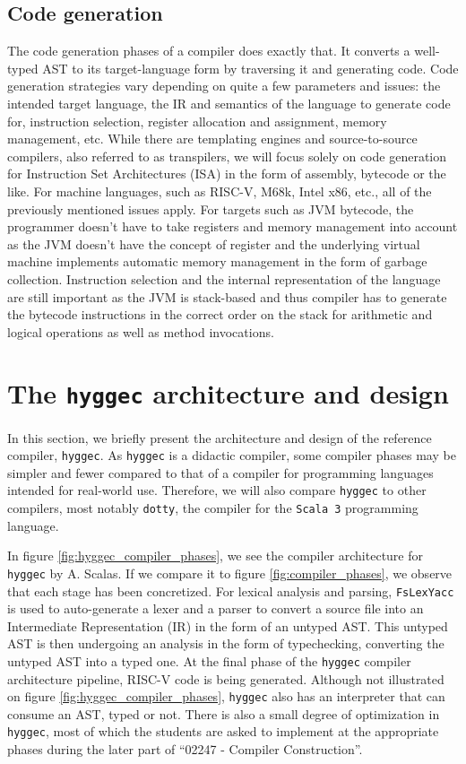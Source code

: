 \subsection{Code generation}

The code generation phases of a compiler does exactly that. It converts a well-typed AST to its target-language form by traversing it and generating code.
Code generation strategies vary depending on quite a few parameters and issues: the intended target language, the IR and semantics of the language to generate code for,
instruction selection, register allocation and assignment, memory management, etc. While there are templating engines and source-to-source compilers,
also referred to as transpilers, we will focus solely on code generation for Instruction Set Architectures (ISA) in the form of assembly, bytecode or the like.
For machine languages, such as RISC-V, M68k, Intel x86, etc., all of the previously mentioned issues apply. For targets such as JVM bytecode, the programmer
doesn't have to take registers and memory management into account as the JVM doesn't have the concept of register and the underlying virtual machine
implements automatic memory management in the form of garbage collection. Instruction selection and the internal representation of the language are still
important as the JVM is stack-based and thus compiler has to generate the bytecode instructions in the correct order on the stack for arithmetic and
logical operations as well as method invocations.

\section{The \texttt{hyggec} architecture and design}

In this section, we briefly present the architecture and design of the reference compiler, \texttt{hyggec}. As \texttt{hyggec} is a didactic compiler,
some compiler phases may be simpler and fewer compared to that of a compiler for programming languages intended for real-world use.
Therefore, we will also compare \texttt{hyggec} to other compilers, most notably \texttt{dotty}, the compiler
for the \texttt{Scala 3} programming language.

In figure \ref{fig:hyggec_compiler_phases}, we see the compiler architecture for \texttt{hyggec} by A. Scalas. If we compare it
to figure \ref{fig:compiler_phases}, we observe that each stage has been concretized. For lexical analysis and parsing, \texttt{FsLexYacc}
is used to auto-generate a lexer and a parser to convert a source file into an Intermediate Representation (IR) in the form of an untyped 
AST. This untyped AST is then undergoing an analysis in the form of typechecking, converting the untyped AST into a typed one. At the
final phase of the \texttt{hyggec} compiler architecture pipeline, RISC-V code is being generated. Although not illustrated on figure
\ref{fig:hyggec_compiler_phases}, \texttt{hyggec} also has an interpreter that can consume an AST, typed or not.
There is also a small degree of optimization in \texttt{hyggec}, most of which the students are asked to implement at the appropriate
phases during the later part of ``02247 - Compiler Construction''.

